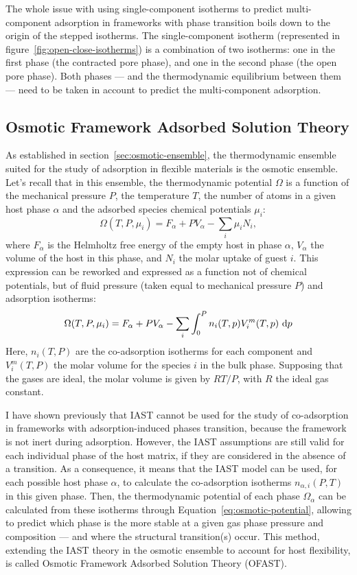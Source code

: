 \documentclass[thesis]{subfiles}
\begin{document}
The whole issue with using single-component isotherms to predict multi-component
adsorption in frameworks with phase transition boils down to the origin of the
stepped isotherms. The single-component isotherm (represented in
figure~\ref{fig:open-close-isotherms}) is a combination of two isotherms: one in
the first phase (the contracted pore phase), and one in the second phase (the
open pore phase). Both phases --- and the thermodynamic equilibrium between them
--- need to be taken in account to predict the multi-component adsorption.

\subsection{Osmotic Framework Adsorbed Solution Theory}

As established in section~\ref{sec:osmotic-ensemble}, the thermodynamic ensemble
suited for the study of adsorption in flexible materials is the osmotic
ensemble. Let's recall that in this ensemble, the thermodynamic potential
$\Omega$ is a function of the mechanical pressure $P$, the temperature $T$, the
number of atoms in a given host phase $\alpha$ and the adsorbed species chemical
potentials $\mu_i$: \[\Omega(T, P, \mu_i) = F_\alpha + P V_\alpha - \sum_i \mu_i
N_i,\] where $F_\alpha$ is the Helmholtz free energy of the empty host in phase
$\alpha$, $V_\alpha$ the volume of the host in this phase, and $N_i$ the molar
uptake of guest $i$. This expression can be reworked and expressed as a function
not of chemical potentials, but of fluid pressure (taken equal to mechanical
pressure $P$) and adsorption isotherms:\cite{Coudert2008} \[
\label{eq:osmotic-potential}\Omega(T, P, \mu_i) = F_\alpha + P V_\alpha - \sum_i
\int_0^P n_i(T, p) V^m_i(T, p) \ \text{d} p\] Here, $n_i(T,P)$ are the co-adsorption
isotherms for each component and $V^m_i(T,P)$ the molar volume for the species
$i$ in the bulk phase. Supposing that the gases are ideal, the molar volume is
given by $RT/P$, with $R$ the ideal gas constant.

I have shown previously that IAST cannot be used for the study of co-adsorption
in frameworks with adsorption-induced phases transition, because the framework
is not inert during adsorption. However, the IAST assumptions are still valid
for each individual phase of the host matrix, if they are considered in the
absence of a transition. As a consequence, it means that the IAST model can be
used, for each possible host phase $\alpha$, to calculate the co-adsorption
isotherms $n_{\alpha,i}(P,T)$ in this given phase. Then, the thermodynamic
potential of each phase $\Omega_{\alpha}$ can be calculated from these isotherms
through Equation~\eqref{eq:osmotic-potential}, allowing to predict which phase is
the more stable at a given gas phase pressure and composition --- and where the
structural transition(s) occur. This method, extending the IAST theory in the
osmotic ensemble to account for host flexibility, is called Osmotic Framework
Adsorbed Solution Theory (OFAST).\cite{Coudert2009, Coudert2010}
\end{document}
